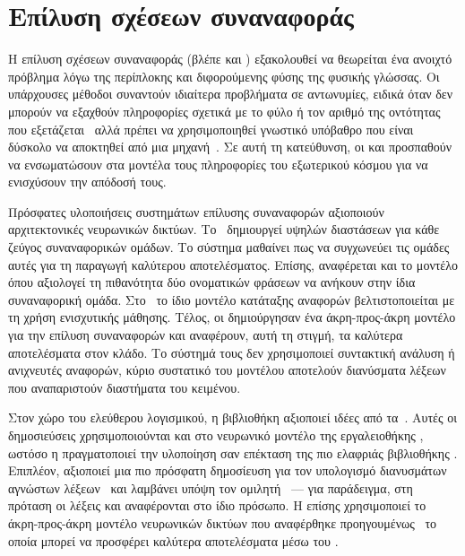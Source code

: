 \section{Επίλυση σχέσεων συναναφοράς}
Η επίλυση σχέσεων συναναφοράς (βλέπε και ) εξακολουθεί να θεωρείται ένα ανοιχτό πρόβλημα λόγω της περίπλοκης και διφορούμενης φύσης της φυσικής γλώσσας.
Οι υπάρχουσες μέθοδοι συναντούν ιδιαίτερα προβλήματα σε αντωνυμίες, ειδικά όταν δεν μπορούν να εξαχθούν πληροφορίες σχετικά με το φύλο ή τον αριθμό της οντότητας που εξετάζεται~\cite{peng2015solving} αλλά πρέπει να χρησιμοποιηθεί γνωστικό υπόβαθρο που είναι δύσκολο να αποκτηθεί από μια μηχανή~\cite{ng2017machine}.
Σε αυτή τη κατεύθυνση, οι \citet{rahman2011coreference} και \citet{zhang2019incorporating} προσπαθούν να ενσωματώσουν στα μοντέλα τους πληροφορίες του εξωτερικού κόσμου για να ενισχύσουν την απόδοσή τους.

Πρόσφατες υλοποιήσεις συστημάτων επίλυσης συναναφορών αξιοποιούν αρχιτεκτονικές νευρωνικών δικτύων.
Το~\cite{CorefAnnotatorN1} δημιουργεί  υψηλών διαστάσεων για κάθε ζεύγος συναναφορικών ομάδων.
Το σύστημα μαθαίνει πως να συγχωνεύει τις ομάδες αυτές για τη παραγωγή καλύτερου αποτελέσματος.
Επίσης, αναφέρεται και το μοντέλο  όπου αξιολογεί τη πιθανότητα δύο ονοματικών φράσεων να ανήκουν στην ίδια συναναφορική ομάδα.
Στο~\cite{CorefAnnotatorN2} το ίδιο μοντέλο κατάταξης αναφορών βελτιστοποιείται με τη χρήση ενισχυτικής μάθησης.
Τέλος, οι \citet{lee2017end} δημιούργησαν ένα άκρη-προς-άκρη μοντέλο για την επίλυση συναναφορών και αναφέρουν, αυτή τη στιγμή, τα καλύτερα αποτελέσματα στον κλάδο.
Το σύστημά τους δεν χρησιμοποιεί συντακτική ανάλυση ή ανιχνευτές αναφορών, κύριο συστατικό του μοντέλου αποτελούν διανύσματα λέξεων που αναπαριστούν διαστήματα του κειμένου.

Στον χώρο του ελεύθερου λογισμικού, η βιβλιοθήκη  αξιοποιεί ιδέες από τα~\cite{CorefAnnotatorN1,CorefAnnotatorN2}.
Αυτές οι δημοσιεύσεις χρησιμοποιούνται και στο νευρωνικό μοντέλο της εργαλειοθήκης ,
ωστόσο η  πραγματοποιεί την υλοποίηση σαν επέκταση της πιο ελαφριάς βιβλιοθήκης .
Επιπλέον, αξιοποιεί μια πιο πρόσφατη δημοσίευση για τον υπολογισμό διανυσμάτων αγνώστων λέξεων~\cite{bahdanau2017learning}
και λαμβάνει υπόψη τον ομιλητή~\cite{raghunathan2010multi} ---
για παράδειγμα, στη πρόταση  οι λέξεις  και  αναφέρονται στο ίδιο πρόσωπο.
Η  επίσης χρησιμοποιεί το άκρη-προς-άκρη μοντέλο νευρωνικών δικτύων που αναφέρθηκε προηγουμένως~\cite{lee2017end} το οποία μπορεί να προσφέρει καλύτερα αποτελέσματα μέσω του .

